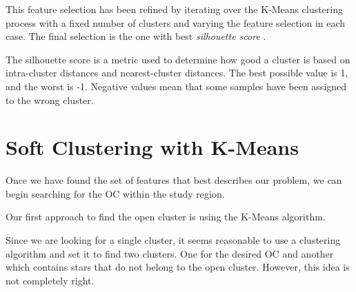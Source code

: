 \documentclass[11pt, a4paper, english]{book}
\begin{document}
This feature selection has been refined by iterating over the K-Means clustering process
with a fixed number of clusters and varying the feature selection in each case.
The final selection is the one with best \emph{silhouette score} \cite{rousseeuw1987silhouettes}.

The silhouette score is a metric used to determine how good a cluster is based on intra-cluster distances and nearest-cluster distances.
The best possible value is 1, and the worst is -1.
Negative values mean that some samples have been assigned to the wrong cluster.

\section{Soft Clustering with K-Means}

Once we have found the set of features that best describes our problem,
we can begin searching for the OC within the study region.

Our first approach to find the open cluster is using the K-Means algorithm.

Since we are looking for a single cluster,
it seems reasonable to use a clustering algorithm and set it to find two clusters.
One for the desired OC and another which contains stars that do not belong to the open cluster.
However, this idea is not completely right.
\end{document}
